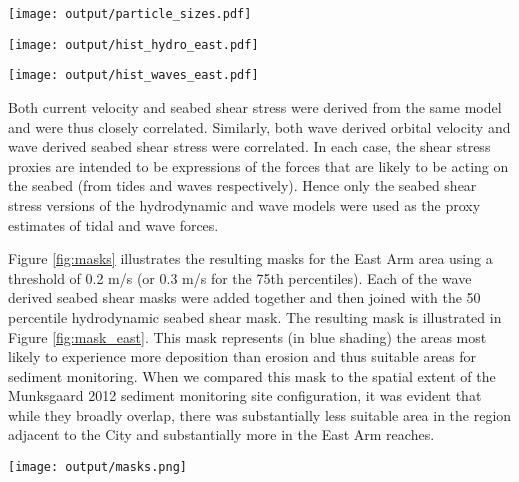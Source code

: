 \documentclass[a4paper]{article}
\let\origfigure=\figure
\let\endorigfigure=\endfigure
\renewenvironment{figure}[1][]{%
   \origfigure[H]
}{%
   \endorigfigure
}
\begin{document}
\begin{figure}
\centering\scriptsize
\texttt{[image: output/particle\_sizes.pdf]}
\caption{The percentage abundance of different sediment grain sizes
observed across the Munksgaard sediment sampling
program.\label{fig:particle_sizes}}
\end{figure}

\begin{figure}
\centering\scriptsize
\texttt{[image: output/hist\_hydro\_east.pdf]}
\caption{Frequency distributions of hydrodynamic products in the East
Arm area.\label{fig:hist_hydro_east}}
\end{figure}

\begin{figure}
\centering\scriptsize
\texttt{[image: output/hist\_waves\_east.pdf]}
\caption{Frequency distributions of wave modelling seabed shear stress
products in the East Arm area.\label{fig:hist_waves_east}}
\end{figure}

Both current velocity and seabed shear stress were derived from the same
model and were thus closely correlated. Similarly, both wave derived
orbital velocity and wave derived seabed shear stress were correlated.
In each case, the shear stress proxies are intended to be expressions of
the forces that are likely to be acting on the seabed (from tides and
waves respectively). Hence only the seabed shear stress versions of the
hydrodynamic and wave models were used as the proxy estimates of tidal
and wave forces.

Figure \ref{fig:masks} illustrates the resulting masks for the East Arm
area using a threshold of 0.2 m/s (or 0.3 m/s for the 75th percentiles).
Each of the wave derived seabed shear masks were added together and then
joined with the 50 percentile hydrodynamic seabed shear mask. The
resulting mask is illustrated in Figure \ref{fig:mask_east}. This mask
represents (in blue shading) the areas most likely to experience more
deposition than erosion and thus suitable areas for sediment monitoring.
When we compared this mask to the spatial extent of the Munksgaard 2012
sediment monitoring site configuration, it was evident that while they
broadly overlap, there was substantially less suitable area in the
region adjacent to the City and substantially more in the East Arm
reaches.

\begin{figure}
\centering\scriptsize
\texttt{[image: output/masks.png]}
\caption{Individual East Arm masks from various hydrodynamic
(bedShear\_\emph{) and wave (beagle\_}) models categorised using a
threshold values of 0.2 for all other than the 75th percentile products
with use a threshold of 0.3 m/s. The blue areas indicate areas of
predicted relatively low erosion and transport potential and thus good
candidate areas for sample site allocation. The black dots illustrate
the position of Munksgaard 2012 sediment sampling
sites.\label{fig:masks}}
\end{figure}
\end{document}
